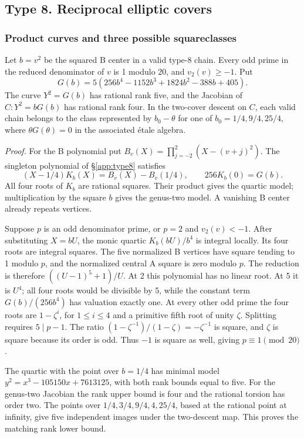 \subsection{Type 8. Reciprocal elliptic covers}\label{detail:type8}

\subsubsection{Product curves and three possible squareclasses}\label{arith:72}

Let \(b=v^2\) be the squared B center in a valid
type-8 chain. Every odd prime in the reduced denominator of \(v\) is
1 modulo 20, and \(v_2(v)\ge-1\). Put
\[G(b)=5(256b^4-1152b^3+1824b^2-388b+405).\]
The curve \(Y^2=G(b)\) has rational rank five, and the Jacobian of
\(C:Y^2=bG(b)\) has rational rank four. In the two-cover descent on
\(C\), each valid chain belongs to the class represented by
\(b_0-\theta\) for one of \(b_0=1/4,9/4,25/4\), where
\(\theta G(\theta)=0\) in the associated étale algebra.

\emph{Proof.} For the B polynomial put
\(B_v(X)=\prod_{j=-2}^2(X-(v+j)^2)\). The singleton polynomial of
\S\ref{app:type8} satisfies
\[(X-1/4)K_b(X)=B_v(X)-B_v(1/4),\qquad 256K_b(0)=G(b).\]
All four roots of \(K_b\) are rational squares. Their product gives
the quartic model; multiplication by the square \(b\) gives the
genus-two model. A vanishing B center already repeats vertices.

Suppose \(p\) is an odd denominator prime, or \(p=2\) and
\(v_2(v)<-1\). After substituting \(X=bU\), the monic quartic
\(K_b(bU)/b^4\) is integral locally. Its four roots are integral
squares. The five normalized B vertices have square tending to 1
modulo \(p\), and the normalized central A square is zero modulo
\(p\). The reduction is therefore \(((U-1)^5+1)/U\). At 2 this
polynomial has no linear root. At 5 it is \(U^4\); all four roots
would be divisible by 5, while the constant term \(G(b)/(256b^4)\)
has valuation exactly one. At every other odd prime the four roots
are \(1-\zeta^i\), for \(1\le i\le4\) and a primitive fifth root of
unity \(\zeta\). Splitting requires \(5\mid p-1\). The ratio
\((1-\zeta^{-1})/(1-\zeta)=-\zeta^{-1}\) is square, and \(\zeta\)
is square because its order is odd. Thus \(-1\) is square as well,
giving \(p\equiv1\pmod {20}\).

The quartic with the point over \(b=1/4\) has minimal model
\(y^2=x^3-105150x+7613125\), with both rank bounds equal to five.
For the genus-two Jacobian the rank upper bound is four and the
rational torsion has order two. The points over
\(1/4,3/4,9/4,4,25/4\), based at the rational point at infinity,
give five independent images under the two-descent map. This proves
the matching rank lower bound.


